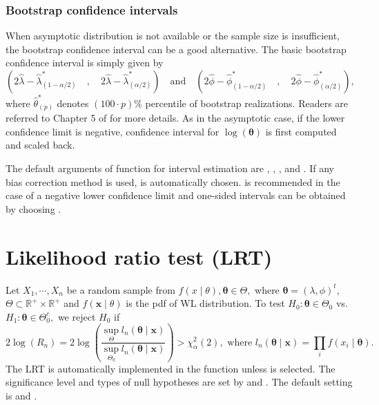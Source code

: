 \subsubsection{Bootstrap confidence intervals}
When asymptotic distribution is not available or the sample size is insufficient, the bootstrap confidence interval can be a good alternative. The basic bootstrap confidence interval is simply given by
$$\left(2\widehat{\lambda}-\widehat{\lambda}^{*}_{(1-\alpha/2)}\quad,\quad 2\widehat{\lambda}-\widehat{\lambda}^{*}_{(\alpha/2)}\right)\quad \text{and} \quad \left(2\widehat{\phi}-\widehat{\phi}^{*}_{(1-\alpha/2)}\quad,\quad 2\widehat{\phi}-\widehat{\phi}^{*}_{(\alpha/2)}\right),$$
where $\hat{\theta}^{*}_{(p)}$ denotes $\left(100\cdot p\right)\%$ percentile of bootstrap realizations. Readers are referred to Chapter 5 of \cite{Davison:1997} for more details.
As in the asymptotic case, if the lower confidence limit is negative, confidence interval for $\log (\boldsymbol{\theta})$ is first computed and scaled back.

The default arguments of  function for interval estimation are , , , and . If any bias correction method is used,  is automatically chosen.  is recommended in the case of a negative lower confidence limit and one-sided intervals can be obtained by choosing .\\

\section{Likelihood ratio test (LRT)}
Let $X_{1}, \cdots, X_{n}$ be a random sample from $f(x \mid \theta), \boldsymbol{\theta} \in \Theta,$ where $\boldsymbol{\theta}=\left(\lambda,\phi\right)^{t}$, $\Theta \subset {}^{+}\times{}^{+}$ and $f(\mid\theta)$ is the pdf of WL distribution.
To test $H_{0}: \boldsymbol{\theta} \in \Theta_{0}$ vs. $H_{1}: \boldsymbol{\theta} \in \Theta_{0}^{c},$ we reject $H_{0}$ if
\[
2 \log (R_{n}) =2 \log \left( \frac{\sup _{\Theta} l_{n}(\boldsymbol{\theta} \mid \boldsymbol{x})}{\sup _{\Theta_{0}} l_{n}(\boldsymbol{\theta} \mid \boldsymbol{x})} \right) > \chi_{\alpha}^{2}(2),\text{ where } l_{n}(\boldsymbol{\theta} \mid \boldsymbol{x}) = \prod\limits_{i} f(x_{i}\mid\boldsymbol{\theta}).
\]
The LRT is automatically implemented in the  function unless  is selected. 
The significance level and types of null hypotheses are set by  and . The default setting is  and .  

